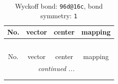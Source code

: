 \documentclass[fleqn,8pt]{jsarticle}
\begin{document}
\renewcommand{\arraystretch}{1.2}
\begin{longtable}{cccc}
\caption{Wyckoff bond: {\tt 96d@16c}, bond symmetry: {\tt 1}}
 \\
 \hline \hline
No. & vector & center & mapping \\ \hline \endfirsthead

\multicolumn{3}{l}{\tablename\ \thetable{}} \\
 \hline \hline
No. & vector & center & mapping \\ \hline \endhead

 \hline \hline
\multicolumn{3}{r}{\footnotesize\it continued ...} \\ \endfoot

 \hline \hline
\multicolumn{3}{r}{} \\ \endlastfoot


\end{longtable}
\end{document}
